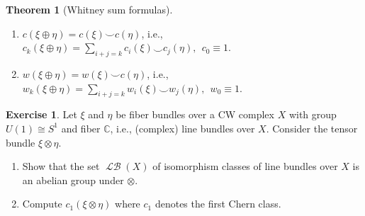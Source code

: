 \documentclass[10pt,letterpaper,cm]{nupset}
\theoremstyle{definition}
\theoremstyle{theorem}
\newtheorem{theorem}[defn]{Theorem}
\newtheorem{exercise}[defn]{Exercise}
\theoremstyle{remark}
\newcommand{\C}{\mathbb C}
\newcommand{\1}{\mathbb{1}}
\newcommand{\0}{\vec 0}
\DeclareMathOperator{\lb}{\mathcal{LB}}
\newcommand{\be}{\begin{enumerate}}
\newcommand{\ee}{\end{enumerate}}
\begin{document}
\begin{theorem}[Whitney sum formulas] $ $
\be
\item $c(\xi \oplus \eta) = c(\xi) \smile c(\eta)$, i.e.,  $c_k(\xi \oplus \eta) = \sum_{i+j =k}c_i(\xi) \smile c_j(\eta), \  \ c_0 \equiv 1$.
\item $w(\xi \oplus \eta) = w(\xi) \smile c(\eta)$, i.e.,  $w_k(\xi \oplus \eta) = \sum_{i+j =k}w_i(\xi) \smile w_j(\eta), \ \ w_0 \equiv 1$.
\ee
\end{theorem}


\begin{exercise}
Let $\xi$ and $\eta$ be fiber bundles over a CW complex $X$ with group $U(1)\cong S^1$ and fiber $\C$, i.e., (complex) line bundles over $X$. Consider the tensor bundle $\xi \otimes \eta$. 
\be[label=(\alph*)]
\item Show that the set $\lb(X)$ of isomorphism classes of line bundles over $X$ is an abelian group under $\otimes$. 
\item Compute $c_1(\xi \otimes \eta)$ where $c_1$ denotes the first Chern class.
\ee
\end{exercise}
\end{document}

